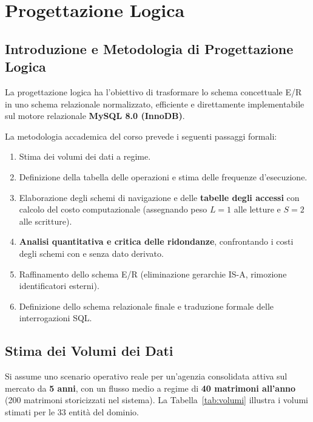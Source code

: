 \chapter{Progettazione Logica}

\section{Introduzione e Metodologia di Progettazione Logica}
La progettazione logica ha l'obiettivo di trasformare lo schema concettuale E/R in uno schema relazionale normalizzato, efficiente e direttamente implementabile sul motore relazionale \textbf{MySQL 8.0 (InnoDB)}.

La metodologia accademica del corso prevede i seguenti passaggi formali:
\begin{enumerate}
    \item Stima dei volumi dei dati a regime.
    \item Definizione della tabella delle operazioni e stima delle frequenze d'esecuzione.
    \item Elaborazione degli schemi di navigazione e delle \textbf{tabelle degli accessi} con calcolo del costo computazionale (assegnando peso $L=1$ alle letture e $S=2$ alle scritture).
    \item \textbf{Analisi quantitativa e critica delle ridondanze}, confrontando i costi degli schemi con e senza dato derivato.
    \item Raffinamento dello schema E/R (eliminazione gerarchie IS-A, rimozione identificatori esterni).
    \item Definizione dello schema relazionale finale e traduzione formale delle interrogazioni SQL.
\end{enumerate}

\section{Stima dei Volumi dei Dati}
Si assume uno scenario operativo reale per un'agenzia consolidata attiva sul mercato da \textbf{5 anni}, con un flusso medio a regime di \textbf{40 matrimoni all'anno} (200 matrimoni storicizzati nel sistema). La Tabella~\ref{tab:volumi} illustra i volumi stimati per le 33 entità del dominio.

